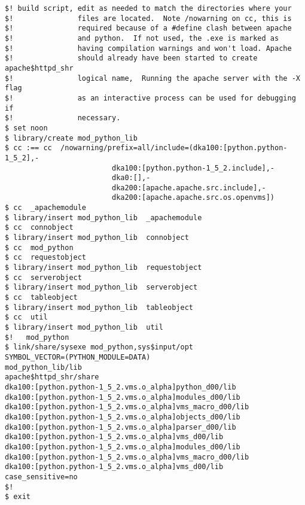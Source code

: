 \begin{verbatim}
$! build script, edit as needed to match the directories where your
$!               files are located.  Note /nowarning on cc, this is
$!               required because of a #define clash between apache
$!               and python.  If not used, the .exe is marked as
$!               having compilation warnings and won't load. Apache
$!               should already have been started to create apache$httpd_shr
$!               logical name,  Running the apache server with the -X flag
$!               as an interactive process can be used for debugging if
$!               necessary.
$ set noon
$ library/create mod_python_lib
$ cc :== cc  /nowarning/prefix=all/include=(dka100:[python.python-1_5_2],-
                         dka100:[python.python-1_5_2.include],-
                         dka0:[],-
                         dka200:[apache.apache.src.include],-
                         dka200:[apache.apache.src.os.openvms]) 
$ cc  _apachemodule
$ library/insert mod_python_lib  _apachemodule
$ cc  connobject
$ library/insert mod_python_lib  connobject
$ cc  mod_python
$ cc  requestobject
$ library/insert mod_python_lib  requestobject
$ cc  serverobject
$ library/insert mod_python_lib  serverobject
$ cc  tableobject
$ library/insert mod_python_lib  tableobject
$ cc  util
$ library/insert mod_python_lib  util
$!   mod_python
$ link/share/sysexe mod_python,sys$input/opt
SYMBOL_VECTOR=(PYTHON_MODULE=DATA)
mod_python_lib/lib
apache$httpd_shr/share
dka100:[python.python-1_5_2.vms.o_alpha]python_d00/lib
dka100:[python.python-1_5_2.vms.o_alpha]modules_d00/lib
dka100:[python.python-1_5_2.vms.o_alpha]vms_macro_d00/lib
dka100:[python.python-1_5_2.vms.o_alpha]objects_d00/lib
dka100:[python.python-1_5_2.vms.o_alpha]parser_d00/lib
dka100:[python.python-1_5_2.vms.o_alpha]vms_d00/lib
dka100:[python.python-1_5_2.vms.o_alpha]modules_d00/lib
dka100:[python.python-1_5_2.vms.o_alpha]vms_macro_d00/lib
dka100:[python.python-1_5_2.vms.o_alpha]vms_d00/lib
case_sensitive=no
$!
$ exit

\end{verbatim}